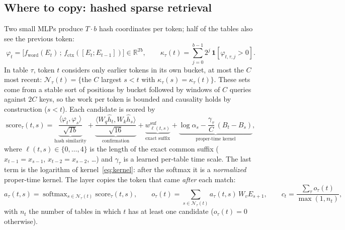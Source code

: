 \documentclass[11pt]{article}
\newcommand{\Nset}{\mathcal{N}}
\DeclareMathOperator{\softmax}{softmax}
\begin{document}
\subsection{Where to copy: hashed sparse retrieval}
\label{sec:search}
Two small MLPs produce $T\cdot b$ hash coordinates per token; half of the tables also see the previous token:
\begin{equation}
\varphi_t=\big[f_{\mathrm{word}}(E_t)\,;\,f_{\mathrm{ctx}}([E_t;E_{t-1}])\big]\in\mathbb{R}^{Tb},\qquad
\kappa_\tau(t)=\sum_{j=0}^{b-1}2^j\,\mathbf{1}[\varphi_{t,\tau,j}>0].
\end{equation}
In table $\tau$, token $t$ considers only earlier tokens in its own bucket, at most the $C$ most recent:
$\Nset_\tau(t)=\{$the $C$ largest $s<t$ with $\kappa_\tau(s)=\kappa_\tau(t)\}$. These sets come from a stable sort of
positions by bucket followed by windows of $C$ queries against $2C$ keys, so the work per token is bounded and
causality holds by construction ($s<t$). Each candidate is scored by
\begin{equation}
\mathrm{score}_\tau(t,s)=
\underbrace{\frac{\langle\varphi_t,\varphi_s\rangle}{\sqrt{Tb}}}_{\text{hash similarity}}
+\underbrace{\frac{\langle W_q\hat h_t,W_k\hat h_s\rangle}{\sqrt{16}}}_{\text{confirmation}}
+\underbrace{w^{\mathrm{suf}}_{\ell(t,s)}}_{\text{exact suffix}}
+\underbrace{\log\alpha_s-\frac{\gamma_\tau}{C}\,(B_t-B_s)}_{\text{proper-time kernel}},
\label{eq:score}
\end{equation}
where $\ell(t,s)\in\{0,\dots,4\}$ is the length of the exact common suffix ($x_{t-1}=x_{s-1}$, $x_{t-2}=x_{s-2}$,
\dots) and $\gamma_\tau$ is a learned per-table time scale. The last term is the logarithm of
kernel~\eqref{eq:kernel}: after the softmax it is a \emph{normalized} proper-time kernel. The layer copies the token
that came \emph{after} each match:
\begin{equation}
a_\tau(t,s)=\softmax_{s\in\Nset_\tau(t)}\mathrm{score}_\tau(t,s),\qquad
o_\tau(t)=\sum_{s\in\Nset_\tau(t)}a_\tau(t,s)\,W_vE_{s+1},\qquad
c_t=\frac{\sum_\tau o_\tau(t)}{\max(1,n_t)},
\end{equation}
with $n_t$ the number of tables in which $t$ has at least one candidate ($o_\tau(t)=0$ otherwise).
\end{document}
